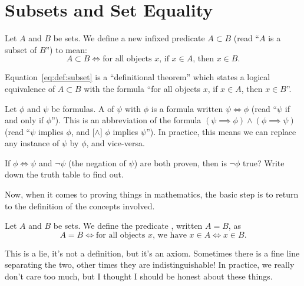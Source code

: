 \section{Subsets and Set Equality}

\begin{definition}
Let $A$ and $B$ be sets. We define a new infixed predicate $A\subset B$
(read ``$A$ is a subset of $B$'') to mean:
\begin{equation}\label{eq:def:subset}
A\subset B\iff\mbox{for all objects $x$, if $x\in A$, then $x\in B$.}
\end{equation}
\end{definition}

Equation~\eqref{eq:def:subset} is a ``definitional theorem'' which states
a logical equivalence of $A\subset B$ with the formula ``for all objects
$x$, if $x\in A$, then $x\in B$''.

\begin{definition}
Let $\phi$ and $\psi$ be formulas. A  of
$\psi$ with $\phi$ is a formula written $\psi\iff\phi$ (read ``$\psi$ if
and only if $\phi$''). This is an abbreviation of the formula
$(\psi\implies\phi)\land(\phi\implies\psi)$ (read ``$\psi$ implies
$\phi$, and [$\land$] $\phi$ implies $\psi$''). In practice, this means
we can replace any instance of $\psi$ by $\phi$, and vice-versa.
\end{definition}

\begin{xca}
If $\phi\iff\psi$ and $\neg\psi$ (the negation of $\psi$) are both
proven, then is $\neg\phi$ true? Write down the truth table to find out.
\end{xca}

Now, when it comes to proving things in mathematics, the basic step is
to return to the definition of the concepts involved.

\begin{definition}
Let $A$ and $B$ be sets. We define the predicate ,
written $A=B$, as
\begin{equation}\label{eq:def:set-equality}
A=B\iff\mbox{for all objects $x$, we have $x\in A\iff x\in B$}.
\end{equation}
\end{definition}

\begin{remark}
This is a lie, it's not a definition, but it's an axiom. Sometimes there
is a fine line separating the two, other times they are
indistinguishable! In practice, we really don't care too much, but I
thought I should be honest about these things.
\end{remark}

